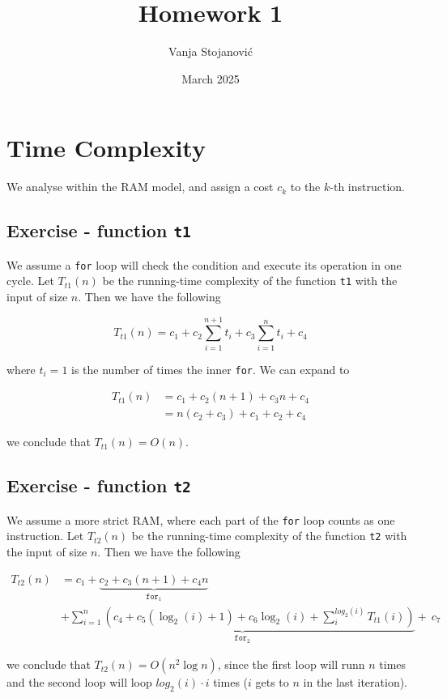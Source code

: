 \documentclass[a4paper]{article}
\title{Homework 1}
\author{Vanja Stojanović}
\date{March 2025}
\begin{document}
\maketitle

\section{Time Complexity}
We analyse within the RAM model, and assign a cost $c_k$ to the $k$-th instruction. 

\subsection{Exercise - function \texttt{t1}}
We assume a \texttt{for} loop will check the condition and execute its operation in one cycle. 
Let $T_{t1}(n)$ be the running-time complexity of the function \texttt{t1} with the input of size $n$. Then we have the following

\[
    T_{t1}(n) = c_1 + c_2 \sum_{i=1}^{n+1}t_i + c_3 \sum_{i=1}^{n}t_i + c_4
\]

\noindent
where $t_i = 1$ is the number of times the inner \texttt{for}. We can expand to

\begin{align*}
    T_{t1}(n) &= c_1 + c_2 (n + 1) + c_3n + c_4\\
    &=  n(c_2 + c_3) + c_1 + c_2 + c_4
\end{align*}

\noindent
we conclude that $T_{t1}(n) = O(n)$.

\subsection{Exercise - function \texttt{t2}}

We assume a more strict RAM, where each part of the \texttt{for} loop counts as one instruction.
Let $T_{t2}(n)$ be the running-time complexity of the function \texttt{t2} with the input of size $n$. Then we have the following

\begin{align*}
    T_{t2}(n) &= c_1 + \underbrace{c_2 + c_3 (n+1) + c_4 n}_{\texttt{for}_1} \\
    &+ \underbrace{\sum_{i = 1}^{n}(c_4 + c_5 (\log_2 (i) + 1) + c_6 \log_2(i)+ \sum_{i}^{log_2(i)} T_{t1}(i))}_{\texttt{for}_2}  +\ c_7
\end{align*}

\noindent
we conclude that $T_{t2}(n)=O(n^2\log n)$, since the first loop will runn $n$ times and the second loop will loop $log_2(i) \cdot i$ times ($i$ gets to $n$ in the last iteration).
\end{document}
